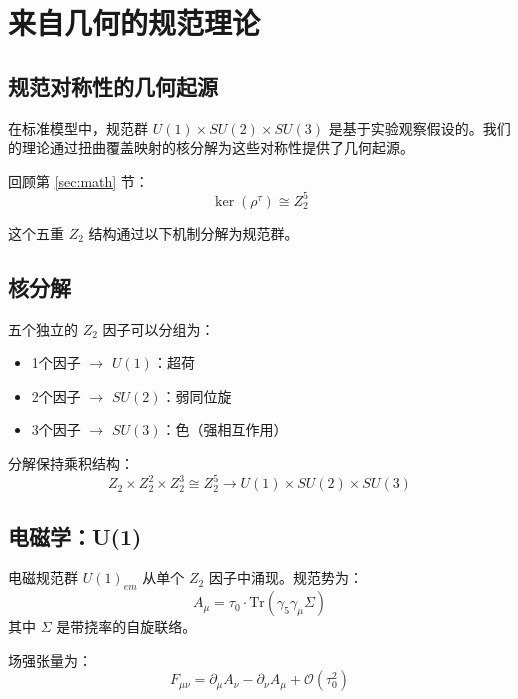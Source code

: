 \section{来自几何的规范理论}
\label{sec:gauge}

\subsection{规范对称性的几何起源}

在标准模型中，规范群 $U(1) \times SU(2) \times SU(3)$ 是基于实验观察假设的。我们的理论通过扭曲覆盖映射的核分解为这些对称性提供了几何起源。

回顾第 \ref{sec:math} 节：
\begin{equation}
    \ker(\rho^\tau) \cong Z_2^5
\end{equation}

这个五重 $Z_2$ 结构通过以下机制分解为规范群。

\subsection{核分解}

五个独立的 $Z_2$ 因子可以分组为：
\begin{itemize}
    \item 1个因子 $\to$ $U(1)$：超荷
    \item 2个因子 $\to$ $SU(2)$：弱同位旋  
    \item 3个因子 $\to$ $SU(3)$：色（强相互作用）
\end{itemize}

分解保持乘积结构：
\begin{equation}
    Z_2 \times Z_2^2 \times Z_2^3 \cong Z_2^5 \to U(1) \times SU(2) \times SU(3)
\end{equation}

\subsection{电磁学：U(1)}

电磁规范群 $U(1)_{em}$ 从单个 $Z_2$ 因子中涌现。规范势为：
\begin{equation}
    A_\mu = \tau_0 \cdot \text{Tr}(\gamma_5 \gamma_\mu \Sigma)
\end{equation}
其中 $\Sigma$ 是带挠率的自旋联络。

场强张量为：
\begin{equation}
    F_{\mu\nu} = \partial_\mu A_\nu - \partial_\nu A_\mu + \mathcal{O}(\tau_0^2)
\end{equation}

